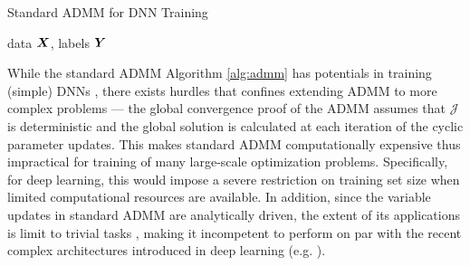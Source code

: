 \begin{algorithm}[htb]
  \caption{Standard ADMM for DNN Training}
  \label{alg:admm}
\begin{algorithmic}
  {\STATE \scalebox{1}{\bfseries Input:} data ${\bm{X}}$, labels ${\bm{Y}}$}
  \STATE  {}
  \STATE  {}
  \REPEAT
  \STATE {}
  \ENDFOR
  \STATE {}
  \STATE {}
  \ENDFOR
    \STATE {}
  \STATE {}
  \STATE {}
  \ENDFOR
  \STATE {}
\end{algorithmic}
\end{algorithm}


While the standard ADMM Algorithm \ref{alg:admm} has potentials in training (simple) DNNs \cite{taylor2016training}, there exists hurdles that confines extending ADMM to more complex problems --- the global convergence proof of the ADMM \cite{deng2016global} assumes that $\mathcal{J}$ is deterministic and the global solution is calculated at each iteration of the cyclic parameter updates.
This makes standard ADMM computationally expensive thus impractical for training of many large-scale optimization problems. Specifically, for  deep learning, this would impose a severe restriction on training set size when limited computational resources are available. In addition, since the variable updates in standard ADMM are analytically driven, the extent of its applications is limit to trivial tasks \cite{taylor2016training}, making it incompetent to perform on par with the recent complex architectures introduced in deep learning (e.g. \cite{he2016deep}).


